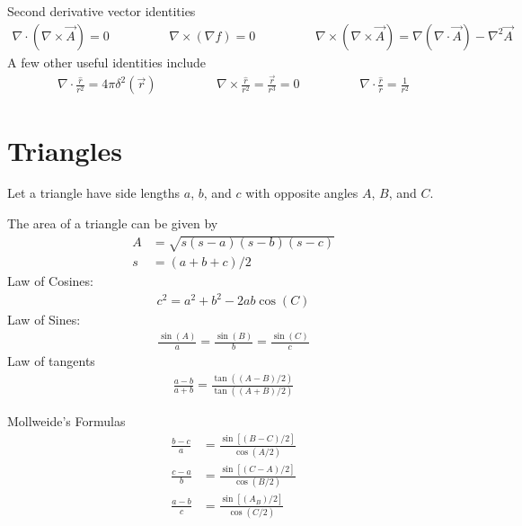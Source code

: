 Second derivative vector identities
\begin{align}
	\nabla \cdot (\nabla \times \vec{A}) =0 \hspace{2cm} \nabla \times (\nabla f)=0 \hspace{2cm}
	\nabla \times (\nabla \times \vec{A}) = \nabla (\nabla \cdot \vec{A})- \nabla^2\vec{A}
\end{align}
A few other useful identities include
\begin{align}
	\nabla \cdot \frac{\hat{r}}{r^2} = 4\pi\delta^2(\vec{r}) \hspace{2cm}\nabla \times \frac{\hat{r}}{r^2} =\frac{\vec{r}}{r^3}= 0 \hspace{2cm} \nabla \cdot \frac{\hat{r}}{r} = \frac{1}{r^2}
\end{align}




\section{Triangles}
Let a triangle have side lengths $a$, $b$, and $c$ with opposite angles $A$, $B$, and $C$. 
\begin{multicols}{2}
The area of a triangle can be given by 
\begin{align}
A&=\sqrt{s(s-a)(s-b)(s-c)} \\
s&=(a+b+c)/2
\end{align}		
Law of Cosines:
\begin{align}
c^2=a^2+b^2-2ab\cos(C)
\end{align}
Law of Sines:
\begin{align}
\frac{\sin(A)}{a}=\frac{\sin(B)}{b}=\frac{\sin(C)}{c}
\end{align}
Law of tangents
\begin{align}
\frac{a-b}{a+b}=\frac{\tan((A-B)/2)}{\tan((A+B)/2)}
\end{align}
\end{multicols}
Mollweide's Formulas
\begin{align}
\frac{b-c}{a} &=\frac{\sin[(B-C)/2]}{\cos(A/2)} \\
\frac{c-a}{b} &=\frac{\sin[(C-A)/2]}{\cos(B/2)} \\
\frac{a-b}{c} &=\frac{\sin[(A_B)/2]}{\cos(C/2)}
\end{align}	










\newpage
